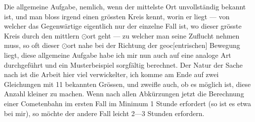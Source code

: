 Die allgemeine Aufgabe, nemlich, wenn der mittelste Ort unvollständig bekannt ist, und man bloss irgend einen grössten Kreis kennt, worin er liegt — von welcher das Gegenwärtige eigentlich nur der einzelne Fall ist, wo dieser grösste Kreis durch den mittlern \(\odot\)ort geht — zu welcher man seine Zuflucht nehmen muss, so oft dieser \(\odot\)ort nahe bei der Richtung der geoc[entrischen] Bewegung liegt, diese allgemeine Aufgabe habe ich mir nun auch auf eine analoge Art durchgeführt und ein Musterbeispiel sorgfältig berechnet\HistoricalNoteEight{Siehe die folgende Notiz.]}. Der Natur der Sache nach ist die Arbeit hier viel verwickelter, ich komme am Ende auf zwei Gleichungen mit 11 bekannten Grössen, und zweifle auch, ob es möglich ist, diese Anzahl kleiner zu machen. Wenn nach allen Abkürzungen jetzt die Berechnung einer Cometenbahn im ersten Fall im Minimum 1 Stunde erfordert (so ist es etwa bei mir), so möchte der andere Fall leicht 2—3 Stunden erfordern.
\par\medskip\noindent\makebox[\linewidth]{\rule{.18\linewidth}{.35pt}}\par
